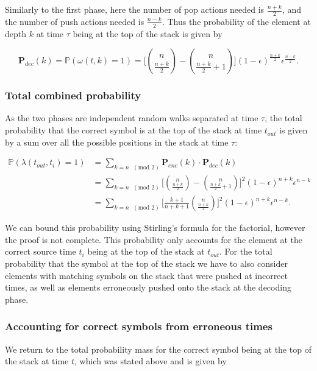 \documentclass{article}
\newcommand{\eps}{\epsilon}
\begin{document}
Similarly to the first phase, here the number of pop actions needed is $\frac{n + k}{2}$, and the number of push actions needed is $\frac{n-k}{2}$. Thus the probability of the element at depth $k$ at time $\tau$ being at the top of the stack is given by 

$$
\mathbf{P}_{dec}(k) = \mathbb{P}(\omega(t,k) = 1) = \bigg[\binom{n}{\frac{n+k}{2}} - \binom{n}{\frac{n+k}{2}+1}\bigg] (1- \eps)^{\frac{n + k}{2}} \eps^{\frac{n-k}{2}}.
$$



\subsubsection*{Total combined probability}

As the two phases are independent random walks separated at time $\tau$, the total probability that the correct symbol is at the top of the stack at time $t_{out}$ is given by a sum over all the possible positions in the stack at time $\tau$:

\begin{align*}
\mathbb{P}(\lambda(t_{out},t_{i}) = 1) &= \sum_{k = n \text{ }(\text{mod }2)} \mathbf{P}_{enc}(k) \cdot \mathbf{P}_{dec}(k) \\
&= \sum_{k = n \text{ }(\text{mod }2)}  \bigg[\binom{n}{\frac{n+k}{2}} - \binom{n}{\frac{n+k}{2}+1}\bigg]^2 (1- \eps)^{n + k} \eps^{n-k} \\
&= \sum_{k = n \text{ }(\text{mod }2)} \bigg[\frac{k+1}{n+k+1}\binom{n}{\frac{n+k}{2}}\bigg]^2 (1- \eps)^{n + k} \eps^{n-k}.
\end{align*}

We can bound this probability using Stirling's formula for the factorial, however the proof is not complete. This probability only accounts for the element at the correct source time $t_i$ being at the top of the stack at $t_{out}$. For the total probability that the symbol at the top of the stack we have to also consider elements with matching symbols on the stack that were pushed at incorrect times, as well as elements erroneously pushed onto the stack at the decoding phase.

\subsubsection{Accounting for correct symbols from erroneous times}

We return to the total probability mass for the correct symbol being at the top of the stack at time $t$, which was stated above and is given by 
\end{document}
